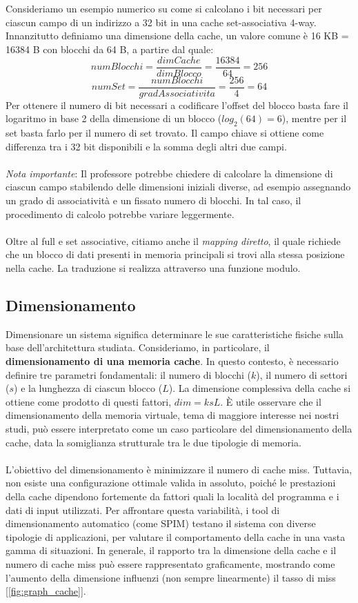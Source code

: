 \\
\\
Consideriamo un esempio numerico su come si calcolano i bit necessari per ciascun campo di un indirizzo a 32 bit in una cache set-associativa 4-way. Innanzitutto definiamo una dimensione della cache, un valore comune è 16 KB = 16384 B con blocchi da 64 B, a partire dal quale:
\[numBlocchi = \frac{dimCache}{dimBlocco} = \frac{16384}{64}=256\]
\[numSet = \frac{numBlocchi}{gradAssociativita} = \frac{256}{4}=64\]
Per ottenere il numero di bit necessari a codificare l'offset del blocco basta fare il logaritmo in base 2 della dimensione di un blocco ($log_2(64)=6$), mentre per il set basta farlo per il numero di set trovato. Il campo chiave si ottiene come differenza tra i 32 bit disponibili e la somma degli altri due campi. 
\\
\\
\textit{Nota importante}: Il professore potrebbe chiedere di calcolare la dimensione di ciascun campo stabilendo delle dimensioni iniziali diverse, ad esempio assegnando un grado di associatività e un fissato numero di blocchi. In tal caso, il procedimento di calcolo potrebbe variare leggermente.
\\
\\
Oltre al full e set associative, citiamo anche il \textit{mapping diretto}, il quale richiede che un blocco di dati presenti in memoria principali si trovi alla stessa posizione nella cache. La traduzione si realizza attraverso una funzione modulo.

\subsection{Dimensionamento}
Dimensionare un sistema significa determinare le sue caratteristiche fisiche sulla base dell'architettura studiata. Consideriamo, in particolare, il \textbf{dimensionamento di una memoria cache}. In questo contesto, è necessario definire tre parametri fondamentali: il numero di blocchi (\(k\)), il numero di settori (\(s\)) e la lunghezza di ciascun blocco (\(L\)). La dimensione complessiva della cache si ottiene come prodotto di questi fattori, \(dim=ksL\). È utile osservare che il dimensionamento della memoria virtuale, tema di maggiore interesse nei nostri studi, può essere interpretato come un caso particolare del dimensionamento della cache, data la somiglianza strutturale tra le due tipologie di memoria.
\\
\\
L’obiettivo del dimensionamento è minimizzare il numero di cache miss. Tuttavia, non esiste una configurazione ottimale valida in assoluto, poiché le prestazioni della cache dipendono fortemente da fattori quali la località del programma e i dati di input utilizzati. Per affrontare questa variabilità, i tool di dimensionamento automatico (come SPIM) testano il sistema con diverse tipologie di applicazioni, per valutare il comportamento della cache in una vasta gamma di situazioni. In generale, il rapporto tra la dimensione della cache e il numero di cache miss può essere rappresentato graficamente, mostrando come l’aumento della dimensione influenzi (non sempre linearmente) il tasso di miss [\ref{fig:graph_cache}].

